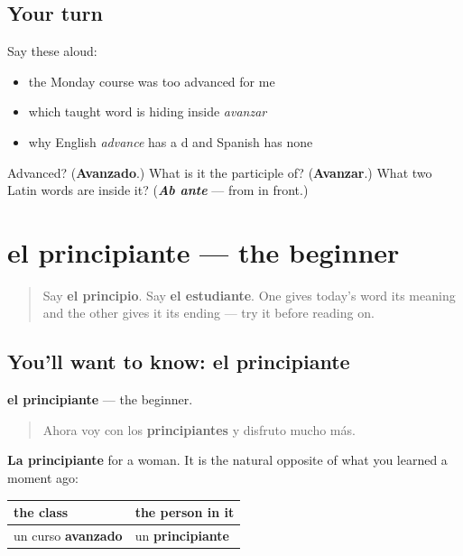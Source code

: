 \subsection*{Your turn}
Say these aloud:

\begin{itemize}
\raggedright
  \item the Monday course was too advanced for me
  \item which taught word is hiding inside \emph{avanzar}
  \item why English \emph{advance} has a d and Spanish has none
\end{itemize}

\begin{tcolorbox}[breakable,colback=teal!4,colframe=teal!35!black,title={Before you move on}]
Advanced? (\textbf{Avanzado}.) What is it the participle of? (\textbf{Avanzar}.) What two Latin words are inside it? (\emph{\textbf{Ab ante}} — from in front.)
\end{tcolorbox}
\section[el principiante]{el principiante — the beginner}

\label{lesson:ES-C471-principiante}



\begin{quote}
Say \textbf{el principio}. Say \textbf{el estudiante}. One gives today's word its meaning and the other gives it its ending — try it before reading on.
\end{quote}

\subsection*{You'll want to know: el principiante}
\textbf{el principiante} — the beginner.

\begin{quote}
Ahora voy con los \textbf{principiantes} y disfruto mucho más.
\end{quote}

\textbf{La principiante} for a woman. It is the natural opposite of what you learned a moment ago:

\noindent
\begin{tabularx}{\linewidth}{@{}>{\raggedright\arraybackslash}X>{\raggedright\arraybackslash}X@{}}
\toprule
\textbf{the class} & \textbf{the person in it} \\
\midrule
un curso \textbf{avanzado} & un \textbf{principiante} \\
\bottomrule
\end{tabularx}

